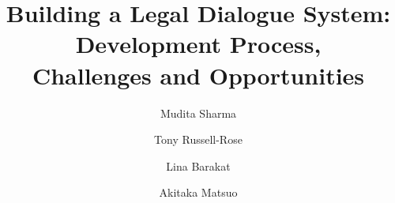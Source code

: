 \documentclass[runningheads]{llncs}
\begin{document}
%
\title{Building a Legal Dialogue System: Development Process,\\ Challenges and Opportunities}
%
\author{Mudita Sharma \and
Tony Russell-Rose \and
Lina Barakat \and
Akitaka Matsuo}
%
%
%
\maketitle              %
%
\newcommand{\faq}{\textsc{FAQ}\xspace}
\newcommand{\ff}{\textsc{FF}\xspace}
\newcommand{\lex}{\textsc{lex}\xspace}
\newcommand{\aws}{\textsc{aws}\xspace}
\newcommand{\cli}{\textsc{cli}\xspace}
\end{document}

